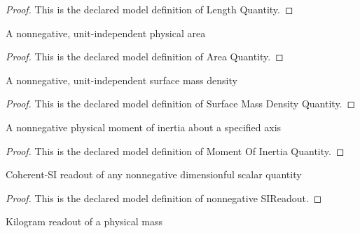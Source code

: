 \begin{proof}
  This is the declared model definition of Length Quantity.
\end{proof}
\begin{definition}
  \label{def:physics:phyx-mini-0700:phyxminiproblems-problemphyxmini0700-areaquantity}
  A nonnegative, unit-independent physical area
\end{definition}
\begin{proof}
  This is the declared model definition of Area Quantity.
\end{proof}
\begin{definition}
  \label{def:physics:phyx-mini-0700:phyxminiproblems-problemphyxmini0700-surfacemassdensityquantity}
  A nonnegative, unit-independent surface mass density
\end{definition}
\begin{proof}
  This is the declared model definition of Surface Mass Density Quantity.
\end{proof}
\begin{definition}
  \label{def:physics:phyx-mini-0700:phyxminiproblems-problemphyxmini0700-momentofinertiaquantity}
  A nonnegative physical moment of inertia about a specified axis
\end{definition}
\begin{proof}
  This is the declared model definition of Moment Of Inertia Quantity.
\end{proof}
\begin{definition}
  \label{def:physics:phyx-mini-0700:phyxminiproblems-problemphyxmini0700-nonnegativesireadout}
  Coherent-SI readout of any nonnegative dimensionful scalar quantity
\end{definition}
\begin{proof}
  This is the declared model definition of nonnegative SIReadout.
\end{proof}
\begin{definition}
  \label{def:physics:phyx-mini-0700:phyxminiproblems-problemphyxmini0700-massinkilograms}
  Kilogram readout of a physical mass
\end{definition}
